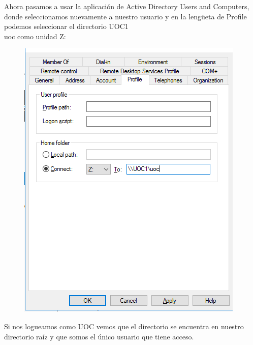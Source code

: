 \documentclass[10pt,a4paper]{article}
\begin{document}
Ahora pasamos a usar la aplicación de Active Directory Users and Computers, donde seleccionamos nuevamente a nuestro usuario y en la lengüeta de Profile podemos seleccionar el directorio UOC1\\uoc como unidad Z:

\begin{figure}[h!]
\centering
\includegraphics[scale=0.6]{z.png}
\end{figure}

Si nos logueamos como UOC vemos que el directorio se encuentra en nuestro directorio raíz y que somos el único usuario que tiene acceso.
\end{document}
